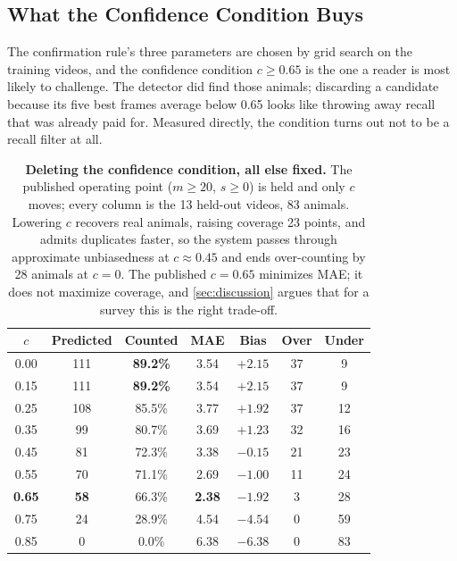 \subsection{What the Confidence Condition Buys}
\label{sec:sensitivity}

The confirmation rule's three parameters are chosen by grid search on the training videos, and the confidence condition
$c\ge0.65$ is the one a reader is most likely to challenge. The detector did find those
animals; discarding a candidate because its five best frames average below 0.65 looks like
throwing away recall that was already paid for. Measured directly, the condition turns out not to be a recall filter at all.

\begin{table}[H]
\caption{\textbf{Deleting the confidence condition, all else fixed.} The published operating
point ($m\ge20$, $s\ge0$) is held and only $c$ moves; every column is the 13 held-out videos,
83 animals. Lowering $c$ recovers real animals, raising coverage 23 points, and admits duplicates faster, so the system passes through approximate unbiasedness at $c\approx0.45$
and ends over-counting by 28 animals at $c=0$. The published $c=0.65$ minimizes MAE; it does
not maximize coverage, and \cref{sec:discussion} argues that for a survey this is the right
trade-off.\label{tab:confsens}}
\centering
\begin{tabularx}{\textwidth}{CCCCCCC}
\toprule
\textbf{$c$} & \textbf{Predicted} & \textbf{Counted} & \textbf{MAE} & \textbf{Bias} & \textbf{Over} & \textbf{Under} \\
 & 111 & \textbf{89.2\%} & 3.54 & $+2.15$ & 37 & 9 \\
0.15 & 111 & \textbf{89.2\%} & 3.54 & $+2.15$ & 37 & 9 \\
0.25 & 108 & 85.5\% & 3.77 & $+1.92$ & 37 & 12 \\
0.35 &  99 & 80.7\% & 3.69 & $+1.23$ & 32 & 16 \\
0.45 &  81 & 72.3\% & 3.38 & $\mathbf{-0.15}$ & 21 & 23 \\
0.55 &  70 & 71.1\% & 2.69 & $-1.00$ & 11 & 24 \\
\textbf{0.65} & \textbf{58} & 66.3\% & \textbf{2.38} & $-1.92$ & 3 & 28 \\
0.75 &  24 & 28.9\% & 4.54 & $-4.54$ & 0 & 59 \\
0.85 &   0 &  0.0\% & 6.38 & $-6.38$ & 0 & 83 \\
\bottomrule
\end{tabularx}
\end{table}

